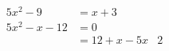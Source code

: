 \documentclass[11pt]{article}
\begin{document}
\begin{align}
5x^2-9&=x+3\\
5x^2-x-12&=0\\
&=12+x-5x&2
\end{align}
\end{document}
